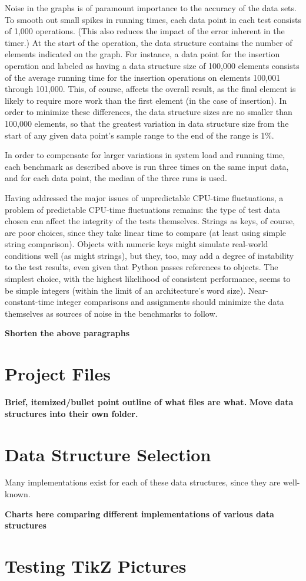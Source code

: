 \documentclass{article}
\newcommand {\todo}[1] {{\textbf{\color{red}#1}}}
\begin{document}
Noise in the graphs is of paramount importance to the accuracy of the data sets. To smooth out small spikes in running times, each data point in each test consists of 1,000 operations. (This also reduces the impact of the error inherent in the timer.) At the start of the operation, the data structure contains the number of elements indicated on the graph. For instance, a data point for the insertion operation and labeled as having a data structure size of 100,000 elements consists of the average running time for the insertion operations on elements 100,001 through 101,000. This, of course, affects the overall result, as the final element is likely to require more work than the first element (in the case of insertion). In order to minimize these differences, the data structure sizes are no smaller than 100,000 elements, so that the greatest variation in data structure size from the start of any given data point's sample range to the end of the range is 1\%.

In order to compensate for larger variations in system load and running time, each benchmark as described above is run three times on the same input data, and for each data point, the median of the three runs is used.

Having addressed the major issues of unpredictable CPU-time fluctuations, a problem of predictable CPU-time fluctuations remains: the type of test data chosen can affect the integrity of the tests themselves. Strings as keys, of course, are poor choices, since they take linear time to compare (at least using simple string comparison). Objects with numeric keys might simulate real-world conditions well (as might strings), but they, too, may add a degree of instability to the test results, even given that Python passes references to objects. The simplest choice, with the highest likelihood of consistent performance, seems to be simple integers (within the limit of an architecture's word size). Near-constant-time integer comparisons and assignments should minimize the data themselves as sources of noise in the benchmarks to follow.

\todo{Shorten the above paragraphs}

\section{Project Files}
\todo{Brief, itemized/bullet point outline of what files are what.}
\todo{Move data structures into their own folder.}

\section{Data Structure Selection}
Many implementations exist for each of these data structures, since they are well-known. 

\todo{Charts here comparing different implementations of various data structures}

\newpage
\section{Testing TikZ Pictures}




\end{document}
